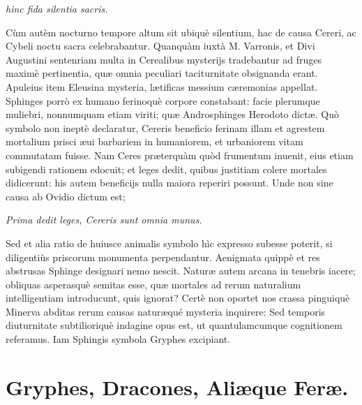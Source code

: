 \documentclass[a4paper, 11pt, oneside, polutonikogreek, latin]{article}
\begin{document}
\emph{hinc fida silentia sacris.}

Cùm autèm nocturno tempore altum sit ubiquè silentium, hac de causa Cereri, ac Cybeli noctu sacra celebrabantur. Quanquàm iuxtà M. Varronis, et Divi Augustini sentenriam multa in Cerealibus mysterijs tradebantur ad fruges maximè pertinentia, quæ omnia peculiari taciturnitate obsignanda erant. Apuleius item Eleusina mysteria, lætificas messium cæremonias appellat. Sphinges porrò ex humano ferinoquè corpore constabant: facie plerumque muliebri, nonnumquam etiam viriti; quæ Androsphinges Herodoto dictæ. Quò symbolo non ineptè declaratur, Cereris beneficio ferinam illam et agrestem mortalium prisci æui barbariem in humaniorem, et urbaniorem vitam commutatam fuisse. Nam Ceres præterquàm quòd frumentum inuenit, eius etiam subigendi rationem edocuit; et leges dedit, quibus justitiam colere mortales didicerunt: his autem beneficijs nulla maiora reperiri possunt. Unde non sine causa ab Ovidio dictum est;

\emph{Prima dedit leges, Cereris sunt omnia munus.}

Sed et alia ratio de huiusce animalis symbolo hìc expresso subesse poterit, si diligentiùs priscorum monumenta perpendantur. Aenigmata quippè et res abstrusas Sphinge designari nemo nescit. Naturæ autem arcana in tenebris iacere; obliquas asperasquè semitas esse, quæ mortales ad rerum naturalium intelligentiam introducunt, quis ignorat? Certè non oportet nos crassa pinguiquè Minerva abditas rerum causas naturæqué mysteria inquirere: Sed temporis diuturnitate subtilioriquè indagine opus est, ut quantulamcumque cognitionem referamus. Iam Sphingis symbola Gryphes excipiant.
\clearpage
\section{Gryphes, Dracones, Aliæque Feræ.}
\end{document}
